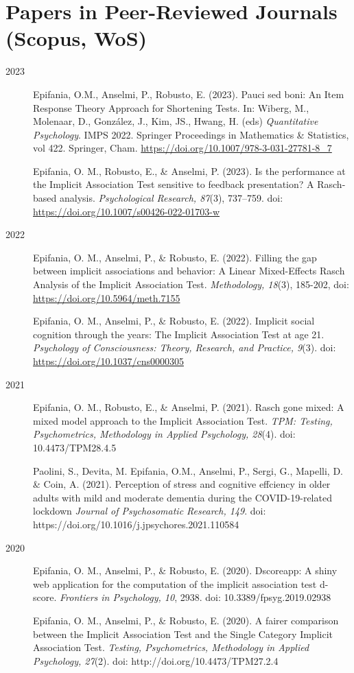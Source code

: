 \documentclass[letterpaper,12pt]{article}
\begin{document}
\section{Papers in Peer-Reviewed Journals (Scopus, WoS)}
\begin{description}
	\item[2023]

\item[] Epifania, O.M., Anselmi, P., Robusto, E. (2023). Pauci sed boni: An Item Response Theory Approach for Shortening Tests. In: Wiberg, M., Molenaar, D., González, J., Kim, JS., Hwang, H. (eds) \emph{Quantitative Psychology}. IMPS 2022. Springer Proceedings in Mathematics \& Statistics, vol 422. Springer, Cham. \url{https://doi.org/10.1007/978-3-031-27781-8_7}
\item[] Epifania, O. M., Robusto, E., \& Anselmi, P. (2023). Is the performance at the Implicit Association Test sensitive to feedback presentation? A Rasch-based analysis. \emph{Psychological
	Research, 87}(3), 737--759. doi: \href{https://doi.org/10.1007/s00426-022-01703-w}{https://doi.org/10.1007/s00426-022-01703-w}


	\item[2022] 
\item[] Epifania, O. M., Anselmi, P., \& Robusto, E. (2022). Filling the gap between implicit associations and behavior: A Linear Mixed-Effects Rasch Analysis of the Implicit Association Test. \emph{Methodology, 18}(3), 185-202, doi: \url{https://doi.org/10.5964/meth.7155}
\item[] Epifania, O. M., Anselmi, P., \& Robusto, E. (2022). Implicit social cognition through the years: The Implicit Association Test at age 21. \emph{Psychology of Consciousness: Theory, Research, and Practice, 9}(3). doi: \url{https://doi.org/10.1037/cns0000305}

\item[2021] 
\item[] Epifania, O. M., Robusto, E., \& Anselmi, P. (2021). Rasch gone mixed: A mixed model approach to the Implicit Association Test. \emph{TPM: Testing, Psychometrics, Methodology in Applied Psychology, 28}(4). doi: 10.4473/TPM28.4.5
\item[] Paolini, S., Devita, M. Epifania, O.M., Anselmi, P., Sergi, G., Mapelli, D. \& Coin, A. (2021). Perception of stress and cognitive effciency in older adults with mild and moderate dementia during the COVID-19-related lockdown \emph{Journal of Psychosomatic Research, 149}. doi: https://doi.org/10.1016/j.jpsychores.2021.110584
\item [2020]
\item[] Epifania, O. M., Anselmi, P., \& Robusto, E. (2020). Dscoreapp: A shiny web application for the computation of the implicit association test d-score. \emph{Frontiers in Psychology, 10}, 2938. doi: 10.3389/fpsyg.2019.02938
\item[] Epifania, O. M., Anselmi, P., \& Robusto, E. (2020). A fairer comparison between the Implicit Association Test and the Single Category Implicit Association Test. \emph{Testing, Psychometrics, Methodology in Applied Psychology, 27}(2). doi: http://doi.org/10.4473/TPM27.2.4
\end{description}
\end{document}
